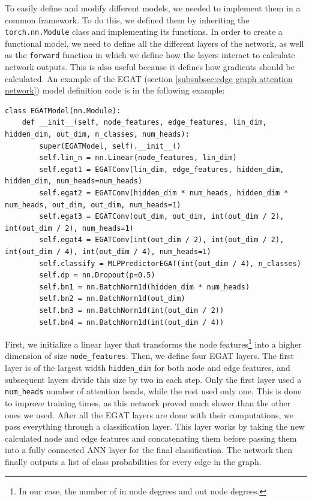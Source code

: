 \documentclass[times, utf8, diplomski, english]{fer_eng}
\begin{document}
To easily define and modify different models, we needed to implement them in a common framework. To do this, we defined them by inheriting the \texttt{torch.nn.Module} class and implementing its functions. In order to create a functional model, we need to define all the different layers of the network, as well as the \texttt{forward} function in which we define how the layers interact to calculate network outputs. This is also useful because it defines how gradients should be calculated. An example of the EGAT (section \ref{subsubsec:edge graph attention network}) model definition code is in the following example:
\begin{lstlisting}
class EGATModel(nn.Module):
	def __init__(self, node_features, edge_features, lin_dim, hidden_dim, out_dim, n_classes, num_heads):
		super(EGATModel, self).__init__()
		self.lin_n = nn.Linear(node_features, lin_dim)
		self.egat1 = EGATConv(lin_dim, edge_features, hidden_dim, hidden_dim, num_heads=num_heads)
		self.egat2 = EGATConv(hidden_dim * num_heads, hidden_dim * num_heads, out_dim, out_dim, num_heads=1)
		self.egat3 = EGATConv(out_dim, out_dim, int(out_dim / 2), int(out_dim / 2), num_heads=1)
		self.egat4 = EGATConv(int(out_dim / 2), int(out_dim / 2), int(out_dim / 4), int(out_dim / 4), num_heads=1)
		self.classify = MLPPredictorEGAT(int(out_dim / 4), n_classes)
		self.dp = nn.Dropout(p=0.5)
		self.bn1 = nn.BatchNorm1d(hidden_dim * num_heads)
		self.bn2 = nn.BatchNorm1d(out_dim)
		self.bn3 = nn.BatchNorm1d(int(out_dim / 2))
		self.bn4 = nn.BatchNorm1d(int(out_dim / 4))
\end{lstlisting}
First, we initialize a linear layer that transforms the node features\footnote{In our case, the number of in node degrees and out node degrees.} into a higher dimension of size \texttt{node\_features}. Then, we define four EGAT layers. The first layer is of the largest width \texttt{hidden\_dim} for both node and edge features, and subsequent layers divide this size by two in each step. Only the first layer used a \texttt{num\_heads} number of attention heads, while the rest used only one. This is done to improve training times, as this network proved much slower than the other ones we used. After all the EGAT layers are done with their computations, we pass everything through a classification layer. This layer works by taking the new calculated node and edge features and concatenating them before passing them into a fully connected ANN layer for the final classification. The network then finally outputs a list of class probabilities for every edge in the graph.
\end{document}
